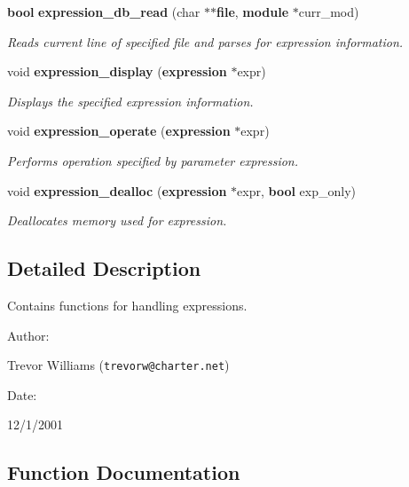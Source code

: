 \begin{CompactItemize}
{\bf bool} {\bf expression\_\-db\_\-read} (char $\ast$$\ast${\bf file}, {\bf module} $\ast$curr\_\-mod)
\begin{CompactList}\small\item\em Reads current line of specified file and parses for expression information.\item\end{CompactList}\item 
void {\bf expression\_\-display} ({\bf expression} $\ast$expr)
\begin{CompactList}\small\item\em Displays the specified expression information.\item\end{CompactList}\item 
void {\bf expression\_\-operate} ({\bf expression} $\ast$expr)
\begin{CompactList}\small\item\em Performs operation specified by parameter expression.\item\end{CompactList}\item 
void {\bf expression\_\-dealloc} ({\bf expression} $\ast$expr, {\bf bool} exp\_\-only)
\begin{CompactList}\small\item\em Deallocates memory used for expression.\item\end{CompactList}\end{CompactItemize}


\subsection{Detailed Description}
Contains functions for handling expressions.



\begin{Desc}
\item[Author: ]\par
Trevor Williams ({\tt trevorw@charter.net}) \end{Desc}
\begin{Desc}
\item[Date: ]\par
12/1/2001\end{Desc}


\subsection{Function Documentation}
